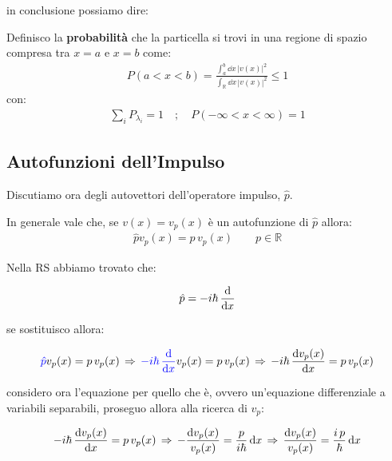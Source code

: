 	in conclusione possiamo dire:
	
\begin{mydef}
	Definisco la \textbf{probabilità} che la particella si trovi in una regione di spazio compresa tra $x = a$ e $ x= b$ come:
\begin{align*}
	P(a<x<b) = \frac{  \int_{a}^{b} \dd x \, |v(x)|^2  }{  \int_{\mathbb{R}} \dd x \, |v(x)|^2    } \leq 1
\end{align*}
	con:
\begin{align*}
	\sum_i P_{\lambda_i} = 1 \quad ; \quad P(-\infty < x < \infty) = 1
\end{align*}
\end{mydef}
	
\subsection{Autofunzioni dell'Impulso}	

	Discutiamo ora degli autovettori dell'operatore impulso, $\hat{p}$.

\begin{nb}
	In generale vale che, se $v(x) = v_p(x)$ è un autofunzione di $\hat{p}$ allora:
\begin{align*}
	\hat{p}v_p(x) = p \, v_p(x) \qquad p \in \mathbb{R}
\end{align*}
\end{nb}

	Nella RS abbiamo trovato che:
	
\begin{align*}
	\hat{p} = - i\hbar \, \dv{x}
\end{align*}

	se sostituisco allora:

\begin{align*}
	\textcolor{blue}{\hat{p}}v_p(x) = p \, v_p(x) \, \Rightarrow \, \textcolor{blue}{- i\hbar \, \dv{x}}v_p(x) = p \, v_p(x) \, \Rightarrow \,  - i\hbar \, \dv{v_p(x)}{x} = p \, v_p(x)
\end{align*}
	
	considero ora l'equazione per quello che è, ovvero un'equazione differenziale a variabili separabili, proseguo allora alla ricerca di $v_p$:
	
\begin{align*}
	- i\hbar \, \dv{v_p(x)}{x} = p \, v_p(x) \, \Rightarrow \, - \frac{\dd v_p(x)}{v_p(x)} = \frac{p}{i\hbar} \, \dd x \, \Rightarrow \, \frac{\dd v_p(x)}{v_p(x)} = \frac{i\, p}{\hbar} \, \dd x
\end{align*}

